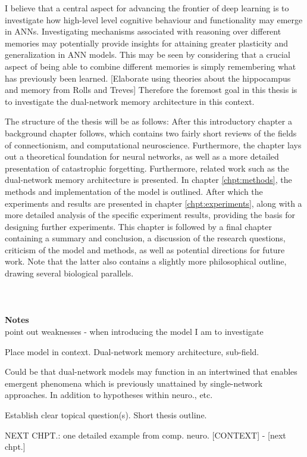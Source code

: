 I believe that a central aspect for advancing the frontier of deep learning is to investigate how high-level level cognitive behaviour and functionality may emerge in ANNs. Investigating mechanisms associated with reasoning over different memories may potentially provide insights for attaining greater plasticity and generalization in ANN models. This may be seen by considering that a crucial aspect of being able to combine different memories is simply remembering what has previously been learned. [Elaborate using theories about the hippocampus and memory from Rolls and Treves] Therefore the foremost goal in this thesis is to investigate the dual-network memory architecture in this context.

The structure of the thesis will be as follows: After this introductory chapter a background chapter follows, which contains two fairly short reviews of the fields of connectionism, and computational neuroscience. Furthermore, the chapter lays out a theoretical foundation for neural networks, as well as a more detailed presentation of catastrophic forgetting. Furthermore, related work such as the dual-network memory architecture is presented. In chapter \ref{chpt:methods}, the methods and implementation of the model is outlined. After which the experiments and results are presented in chapter \ref{chpt:experiments}, along with a more detailed analysis of the specific experiment results, providing the basis for designing further experiments. This chapter is followed by a final chapter containing a summary and conclusion, a discussion of the research questions, criticism of the model and methods, as well as potential directions for future work. Note that the latter also contains a slightly more philosophical outline, drawing several biological parallels.
\\\\\\\\


\textbf{Notes}
\\

point out weaknesses - when introducing the model I am to investigate

Place model in context.
Dual-network memory architecture, sub-field.

Could be that dual-network models may function in an intertwined that enables emergent phenomena which is previously unattained by single-network approaches. In addition to hypotheses within neuro., etc.

Establish clear topical question(s).
Short thesis outline.


NEXT CHPT.:
one detailed example from comp. neuro. [CONTEXT] - [next chpt.]

\cleardoublepage